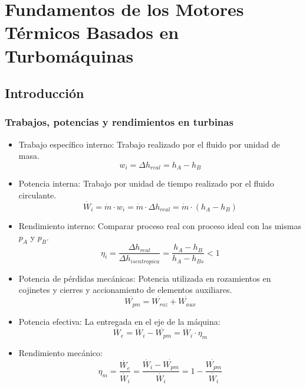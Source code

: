 \chapter{Fundamentos de los Motores Térmicos Basados en Turbomáquinas}
\section{Introducción}
\subsection{Trabajos, potencias y rendimientos en turbinas}
\begin{itemize}
    \item Trabajo específico interno: Trabajo realizado por el fluido por unidad de masa.
    \begin{equation}
        w_i = \Delta h_{real} = h_A - h_B
    \end{equation}
    \item Potencia interna: Trabajo por unidad de tiempo realizado por el fluido circulante.
    \begin{equation}
        \dot{W_i} = \dot{m} \cdot w_i = \dot{m} \cdot \Delta h_{real} = \dot{m} \cdot (h_A - h_B)
    \end{equation}
    \item Rendimiento interno: Comparar proceso real con proceso ideal con las mismas $p_A$ y $p_B$.
    \begin{equation}
        \eta_i = \frac{\Delta h_{real}}{\Delta h_{isentropica}} = \frac{h_A - h_B}{h_A - h_{Bs}} < 1
    \end{equation}
    \item Potencia de pérdidas mecánicas: Potencia utilizada en rozamientos en cojinetes y cierres y accionamiento de elementos auxiliares.
    \begin{equation}
        \dot{W_{pm}} = \dot{W_{roz}} + \dot{W_{aux}}
    \end{equation}
    \item Potencia efectiva: La entregada en el eje de la máquina:
    \begin{equation}
        \dot{W_e} = \dot{W_i} - \dot{W_{pm}} = \dot{W_i} \cdot \eta_m
    \end{equation}
    \item Rendimiento mecánico:
    \begin{equation}
        \eta_m = \frac{\dot{W_e}}{\dot{W_i}} = \frac{\dot{W_i} -  \dot{W_{pm}}}{\dot{W_i}} = 1 - \frac{\dot{W_{pm}}}{\dot{W_i}}
    \end{equation}
\end{itemize}

